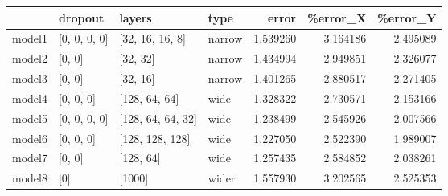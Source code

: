 \begin{tabular}{llllrrr}
\toprule
{} &       dropout &             layers &              type &     error &  \%error\_X &  \%error\_Y \\
\midrule
model1 &  [0, 0, 0, 0] &    [32, 16, 16, 8] &     narrow &  1.539260 &  3.164186 &  2.495089 \\
model2 &        [0, 0] &           [32, 32] &  narrow &  1.434994 &  2.949851 &  2.326077 \\
model3 &        [0, 0] &           [32, 16] &  narrow &  1.401265 &  2.880517 &  2.271405 \\
model4 &     [0, 0, 0] &      [128, 64, 64] &       wide &  1.328322 &  2.730571 &  2.153166 \\
model5 &  [0, 0, 0, 0] &  [128, 64, 64, 32] &       wide &  1.238499 &  2.545926 &  2.007566 \\
model6 &     [0, 0, 0] &    [128, 128, 128] &    wide &  1.227050 &  2.522390 &  1.989007 \\
model7 &        [0, 0] &          [128, 64] &    wide &  1.257435 &  2.584852 &  2.038261 \\
model8 &           [0] &             [1000] &   wider &  1.557930 &  3.202565 &  2.525353 \\
\bottomrule
\end{tabular}
